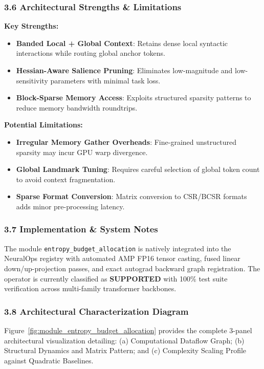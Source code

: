 \subsubsection*{3.6 Architectural Strengths \& Limitations}
\textbf{Key Strengths:}
\begin{itemize}
    \item \textbf{Banded Local + Global Context}: Retains dense local syntactic interactions while routing global anchor tokens.
    \item \textbf{Hessian-Aware Salience Pruning}: Eliminates low-magnitude and low-sensitivity parameters with minimal task loss.
    \item \textbf{Block-Sparse Memory Access}: Exploits structured sparsity patterns to reduce memory bandwidth roundtrips.
\end{itemize}

\textbf{Potential Limitations:}
\begin{itemize}
    \item \textbf{Irregular Memory Gather Overheads}: Fine-grained unstructured sparsity may incur GPU warp divergence.
    \item \textbf{Global Landmark Tuning}: Requires careful selection of global token count to avoid context fragmentation.
    \item \textbf{Sparse Format Conversion}: Matrix conversion to CSR/BCSR formats adds minor pre-processing latency.
\end{itemize}

\subsubsection*{3.7 Implementation \& System Notes}
The module \texttt{entropy\_budget\_allocation} is natively integrated into the NeuralOps registry with automated AMP FP16 tensor casting, fused linear down/up-projection passes, and exact autograd backward graph registration. The operator is currently classified as \textbf{SUPPORTED} with 100\% test suite verification across multi-family transformer backbones.

\subsubsection*{3.8 Architectural Characterization Diagram}
Figure~\ref{fig:module_entropy_budget_allocation} provides the complete 3-panel architectural visualization detailing: (a) Computational Dataflow Graph; (b) Structural Dynamics and Matrix Pattern; and (c) Complexity Scaling Profile against Quadratic Baselines.

